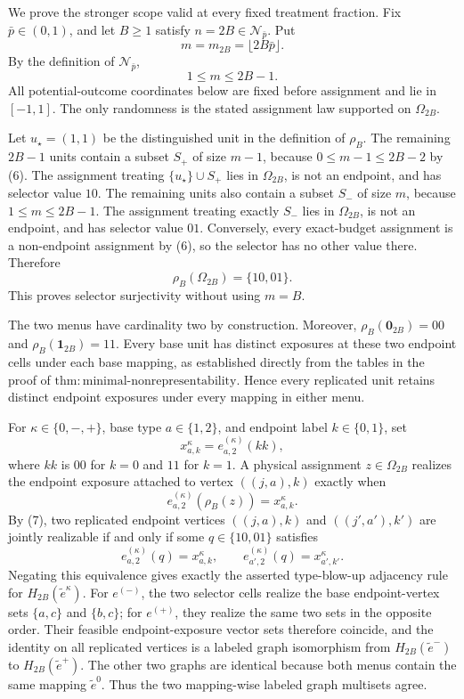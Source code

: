 We prove the stronger scope valid at every fixed treatment fraction.  Fix
\(\bar p\in(0,1)\), and let \(B\ge1\) satisfy
\(n=2B\in\mathcal N_{\bar p}\).  Put
\[
 m=m_{2B}=\lfloor2B\bar p\rfloor.
\]
By the definition of \(\mathcal N_{\bar p}\),
\[
 1\le m\le2B-1. \tag{6}
\]
All potential-outcome coordinates below are fixed before assignment and lie
in \([-1,1]\).  The only randomness is the stated assignment law supported
on \(\Omega_{2B}\).

Let \(u_\star=(1,1)\) be the distinguished unit in the definition of
\(\rho_B\).  The remaining \(2B-1\) units contain a subset \(S_+\) of
size \(m-1\), because \(0\le m-1\le2B-2\) by (6).  The assignment treating
\(\{u_\star\}\cup S_+\) lies in \(\Omega_{2B}\), is not an endpoint, and
has selector value \(10\).  The remaining units also contain a subset
\(S_-\) of size \(m\), because \(1\le m\le2B-1\).  The assignment treating
exactly \(S_-\) lies in \(\Omega_{2B}\), is not an endpoint, and has
selector value \(01\).  Conversely, every exact-budget assignment is a
non-endpoint assignment by (6), so the selector has no other value there.
Therefore
\[
 \rho_B(\Omega_{2B})=\{10,01\}. \tag{7}
\]
This proves selector surjectivity without using \(m=B\).

The two menus have cardinality two by construction.  Moreover,
\(\rho_B(\mathbf 0_{2B})=00\) and
\(\rho_B(\mathbf 1_{2B})=11\).  Every base unit has distinct exposures at
these two endpoint cells under each base mapping, as established directly
from the tables in the proof of
\(\mathrm{thm{:}minimal\text{-}nonrepresentability}\).  Hence every
replicated unit retains distinct endpoint exposures under every mapping in
either menu.

For \(\kappa\in\{0,-,+\}\), base type \(a\in\{1,2\}\), and endpoint label
\(k\in\{0,1\}\), set
\[
 x^\kappa_{a,k}=e^{(\kappa)}_{a,2}(k k),
\]
where \(k k\) is \(00\) for \(k=0\) and \(11\) for \(k=1\).  A physical
assignment \(z\in\Omega_{2B}\) realizes the endpoint exposure attached to
vertex \(((j,a),k)\) exactly when
\[
 e^{(\kappa)}_{a,2}(\rho_B(z))=x^\kappa_{a,k}. \tag{8}
\]
By (7), two replicated endpoint vertices \(((j,a),k)\) and
\(((j',a'),k')\) are jointly realizable if and only if some
\(q\in\{10,01\}\) satisfies
\[
 e^{(\kappa)}_{a,2}(q)=x^\kappa_{a,k},
 \qquad
 e^{(\kappa)}_{a',2}(q)=x^\kappa_{a',k'}.
\]
Negating this equivalence gives exactly the asserted type-blow-up adjacency
rule for \(H_{2B}(\widetilde e^\kappa)\).  For \(e^{(-)}\), the two
selector cells realize the base endpoint-vertex sets \(\{a,c\}\) and
\(\{b,c\}\); for \(e^{(+)}\), they realize the same two sets in the
opposite order.  Their feasible endpoint-exposure vector sets therefore
coincide, and the identity on all replicated vertices is a labeled graph
isomorphism from \(H_{2B}(\widetilde e^-)\) to
\(H_{2B}(\widetilde e^+)\).  The other two graphs are identical because
both menus contain the same mapping \(\widetilde e^0\).  Thus the two
mapping-wise labeled graph multisets agree.

